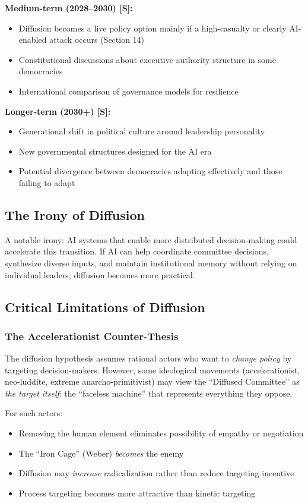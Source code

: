 \documentclass[11pt,letterpaper]{article}
\begin{document}
\textbf{Medium-term (2028--2030) [S]:}
\begin{itemize}
  \item Diffusion becomes a live policy option mainly if a high-casualty or clearly AI-enabled attack occurs (Section 14)
  \item Constitutional discussions about executive authority structure in some democracies
  \item International comparison of governance models for resilience
\end{itemize}

\textbf{Longer-term (2030+) [S]:}
\begin{itemize}
  \item Generational shift in political culture around leadership personality
  \item New governmental structures designed for the AI era
  \item Potential divergence between democracies adapting effectively and those failing to adapt
\end{itemize}

\subsection{The Irony of Diffusion}

A notable irony: AI systems that enable more distributed decision-making could accelerate this transition. If AI can help coordinate committee decisions, synthesize diverse inputs, and maintain institutional memory without relying on individual leaders, diffusion becomes more practical.

\subsection{Critical Limitations of Diffusion}

\subsubsection{The Accelerationist Counter-Thesis}

The diffusion hypothesis assumes rational actors who want to \textit{change policy} by targeting decision-makers. However, some ideological movements (accelerationist, neo-luddite, extreme anarcho-primitivist) may view the ``Diffused Committee'' as \textit{the target itself}: the ``faceless machine'' that represents everything they oppose.

For such actors:
\begin{itemize}
  \item Removing the human element eliminates possibility of empathy or negotiation
  \item The ``Iron Cage'' (Weber) \textit{becomes} the enemy
  \item Diffusion may \textit{increase} radicalization rather than reduce targeting incentive
  \item Process targeting becomes more attractive than kinetic targeting
\end{itemize}
\end{document}

